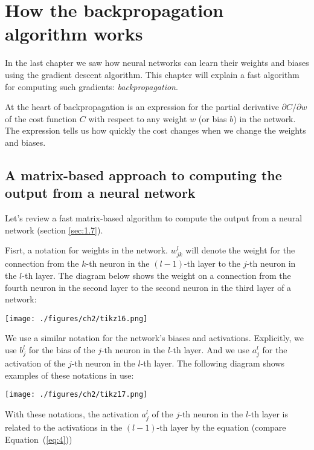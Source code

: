 \documentclass[a4paper,twoside,10pt]{book}
\begin{document}
\chapter{How the backpropagation algorithm works}
In the last chapter we saw how neural networks can learn their weights and biases using the gradient descent algorithm.  This chapter will explain a fast algorithm for computing such gradients: \textit{backpropagation}.

At the heart of backpropagation is an expression for the partial derivative $\partial{}C/\partial{}w$ of the cost function $C$ with respect to any weight $w$ (or bias $b$) in the network. The expression tells us how quickly the cost changes when we change the weights and biases.

\section{A matrix-based approach to computing the output from a neural network}
Let's review a fast matrix-based algorithm to compute the output from a neural network (section \ref{sec:1.7}).

Fisrt, a notation for weights in the network. $w^l_{jk}$ will denote the weight for the connection from the $k$-th neuron in the $(l-1)$-th layer to the $j$-th neuron in the $l$-th layer. The diagram below shows the weight on a connection from the fourth neuron in the second layer to the second neuron in the third layer of a network:

\begin{center}
	\texttt{[image: ./figures/ch2/tikz16.png]}
\end{center}

We use a similar notation for the network's biases and activations. Explicitly, we use $b^l_j$ for the bias of the $j$-th neuron in the $l$-th layer. And we use $a^l_j$ for the activation of the $j$-th neuron in the $l$-th layer. The following diagram shows examples of these notations in use:
\begin{center}
\texttt{[image: ./figures/ch2/tikz17.png]}
\end{center}
With these notations, the activation $a^l_j$ of the $j$-th neuron in the $l$-th layer is related to the activations in the $(l-1)$-th layer by the equation (compare Equation~(\ref{eq:4}))
\end{document}
